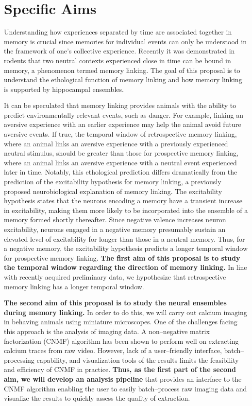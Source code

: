 \documentclass[master.tex]{subfiles}
\begin{document}
\section*{Specific Aims}

Understanding how experiences separated by time are associated together in
memory is crucial since memories for individual events can only be understood in
the framework of one's collective experience. Recently it was demonstrated in
rodents that two neutral contexts experienced close in time can be bound in
memory, a phenomenon termed memory linking. The goal of this proposal is to
understand the ethological function of memory linking and how memory linking is
supported by hippocampal ensembles.

It can be speculated that memory linking provides animals with the ability to
predict environmentally relevant events, such as danger. For example, linking an
aversive experience with an earlier experience may help the animal avoid future
aversive events. If true, the temporal window of retrospective memory linking,
where an animal links an aversive experience with a previously experienced
neutral stimulus, should be greater than those for prospective memory linking,
where an animal links an aversive experience with a neutral event experienced
later in time. Notably, this ethological prediction differs dramatically from
the prediction of the excitability hypothesis for memory linking, a previously
proposed neurobiological explanation of memory linking. The excitability
hypothesis states that the neurons encoding a memory have a transient increase
in excitability, making them more likely to be incorporated into the ensemble of
a memory formed shortly thereafter. Since negative valence increases neuron
excitability, neurons engaged in a negative memory presumably sustain an
elevated level of excitability for longer than those in a neutral memory. Thus,
for a negative memory, the excitability hypothesis predicts a longer temporal
window for prospective memory linking. \textbf{The first aim of this proposal is
  to study the temporal window regarding the direction of memory linking.} In
line with recently acquired preliminary data, we hypothesize that retrospective
memory linking has a longer temporal window.

\textbf{The second aim of this proposal is to study the neural ensembles during
  memory linking.} In order to do this, we will carry out calcium imaging in
behaving animals using miniature microscopes. One of the challenges facing this
approach is the analysis of imaging data. A non--negative matrix factorization
(CNMF) algorithm has been shown to perform well on extracting calcium traces
from raw video. However, lack of a user--friendly interface, batch--processing
capability, and visualization tools of the results limits the feasibility and
efficiency of CNMF in practice. \textbf{Thus, as the first part of the second
  aim, we will develop an analysis pipeline} that provides an interface to the
CNMF algorithm enabling the user to easily batch--process raw imaging data and
visualize the results to quickly assess the quality of extraction.
\end{document}
